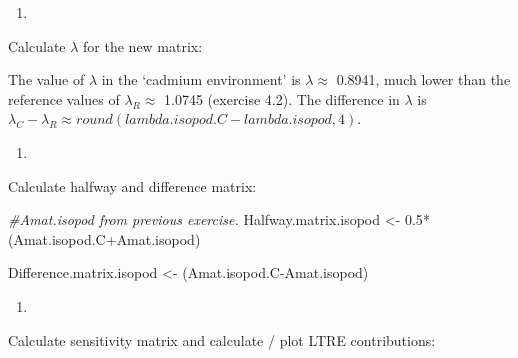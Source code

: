 \documentclass[
]{book}
\newenvironment{Shaded}{\begin{snugshade}}{\end{snugshade}}
\newcommand{\CommentTok}[1]{\textcolor[rgb]{0.56,0.35,0.01}{\textit{#1}}}
\newcommand{\FloatTok}[1]{\textcolor[rgb]{0.00,0.00,0.81}{#1}}
\newcommand{\FunctionTok}[1]{\textcolor[rgb]{0.00,0.00,0.00}{#1}}
\newcommand{\NormalTok}[1]{#1}
\newcommand{\OtherTok}[1]{\textcolor[rgb]{0.56,0.35,0.01}{#1}}
\newcommand{\SpecialCharTok}[1]{\textcolor[rgb]{0.00,0.00,0.00}{#1}}
\providecommand{\tightlist}{%
  \setlength{\itemsep}{0pt}\setlength{\parskip}{0pt}}
\begin{document}
\begin{enumerate}
\def\labelenumi{\arabic{enumi}.}
\setcounter{enumi}{1}
\tightlist
\item
\end{enumerate}

Calculate \(\lambda\) for the new matrix:

\begin{Shaded}
\end{Shaded}

The value of \(\lambda\) in the `cadmium environment' is \(\lambda\approx\) 0.8941, much lower than the reference values of \(\lambda_R\approx\) 1.0745 (exercise 4.2). The difference in \(\lambda\) is \(\lambda_C-\lambda_R\approx round(lambda.isopod.C-lambda.isopod,4)\).

\begin{enumerate}
\def\labelenumi{\arabic{enumi}.}
\setcounter{enumi}{2}
\tightlist
\item
\end{enumerate}

Calculate halfway and difference matrix:

\begin{Shaded}
\begin{Highlighting}[]
\CommentTok{\#Amat.isopod from previous exercise.}
\NormalTok{Halfway.matrix.isopod }\OtherTok{\textless{}{-}} \FloatTok{0.5}\SpecialCharTok{*}\NormalTok{(Amat.isopod.C}\SpecialCharTok{+}\NormalTok{Amat.isopod)}

\NormalTok{Difference.matrix.isopod }\OtherTok{\textless{}{-}}\NormalTok{ (Amat.isopod.C}\SpecialCharTok{{-}}\NormalTok{Amat.isopod)}
\end{Highlighting}
\end{Shaded}

\begin{enumerate}
\def\labelenumi{\arabic{enumi}.}
\setcounter{enumi}{3}
\tightlist
\item
\end{enumerate}

Calculate sensitivity matrix and calculate / plot LTRE contributions:
\end{document}
